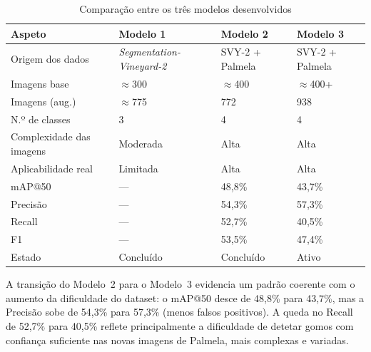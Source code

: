 \begin{table}[H]
  \centering
  \caption{Comparação entre os três modelos desenvolvidos}
  \label{tab:comparacao_modelos}
  \begin{tabularx}{\textwidth}{l X X X}
    \toprule
    \textbf{Aspeto}          & \textbf{Modelo 1} & \textbf{Modelo 2} & \textbf{Modelo 3} \\
    \midrule
    Origem dos dados         & \textit{Segmentation-Vineyard-2} & SVY-2 + Palmela & SVY-2 + Palmela \\
    Imagens base             & $\approx$300      & $\approx$400      & $\approx$400+    \\
    Imagens (aug.)           & $\approx$775      & 772               & 938              \\
    N.º de classes           & 3                 & 4                 & 4                \\
    Complexidade das imagens & Moderada          & Alta              & Alta             \\
    Aplicabilidade real      & Limitada          & Alta              & Alta             \\
    mAP@50                   & ---               & 48,8\%            & 43,7\%           \\
    Precisão                 & ---               & 54,3\%            & 57,3\%           \\
    Recall                   & ---               & 52,7\%            & 40,5\%           \\
    F1                       & ---               & 53,5\%            & 47,4\%           \\
    Estado                   & Concluído         & Concluído         & Ativo            \\
    \bottomrule
  \end{tabularx}
\end{table}

A transição do Modelo~2 para o Modelo~3 evidencia um padrão coerente com
o aumento da dificuldade do dataset: o mAP@50 desce de 48,8\% para 43,7\%,
mas a Precisão sobe de 54,3\% para 57,3\% (menos falsos positivos). A
queda no Recall de 52,7\% para 40,5\% reflete principalmente a dificuldade
de detetar gomos com confiança suficiente nas novas imagens de Palmela,
mais complexas e variadas.

